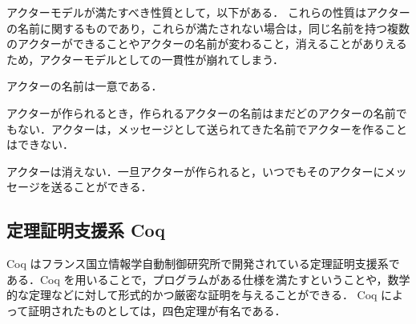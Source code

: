 アクターモデルが満たすべき性質として，以下がある．
これらの性質はアクターの名前に関するものであり，これらが満たされない場合は，同じ名前を持つ複数のアクターができることやアクターの名前が変わること，消えることがありえるため，アクターモデルとしての一貫性が崩れてしまう．

\begin{description}[style=nextline]
  \item[\unique (uniqueness property)] アクターの名前は一意である．
  \item[\fresh (freshness property)] アクターが作られるとき，作られるアクターの名前はまだどのアクターの名前でもない．アクターは，メッセージとして送られてきた名前でアクターを作ることはできない．
  \item[\persist (persistence property)] アクターは消えない．一旦アクターが作られると，いつでもそのアクターにメッセージを送ることができる．
\end{description}





\subsection{定理証明支援系 Coq}

Coq はフランス国立情報学自動制御研究所で開発されている定理証明支援系である\cite[Coq]{Coq}．Coq を用いることで，プログラムがある仕様を満たすということや，数学的な定理などに対して形式的かつ厳密な証明を与えることができる．
Coq によって証明されたものとしては，四色定理が有名である\cite[fourcolor]{fourcolor}．






